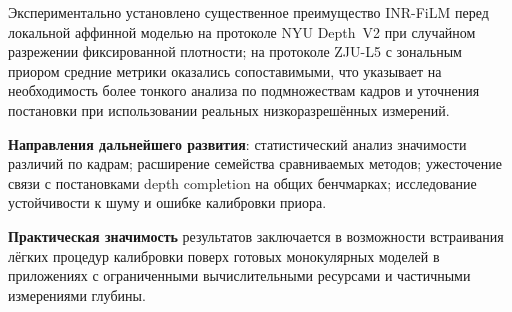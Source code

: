 \documentclass[12pt]{article}
\begin{document}
Экспериментально установлено существенное преимущество INR-FiLM перед локальной аффинной моделью на протоколе NYU Depth~V2 при случайном разрежении фиксированной плотности; на протоколе ZJU-L5 с зональным приором средние метрики оказались сопоставимыми, что указывает на необходимость более тонкого анализа по подмножествам кадров и уточнения постановки при использовании реальных низкоразрешённых измерений.

\textbf{Направления дальнейшего развития}: статистический анализ значимости различий по кадрам; расширение семейства сравниваемых методов; ужесточение связи с постановками depth completion на общих бенчмарках; исследование устойчивости к шуму и ошибке калибровки приора.

\textbf{Практическая значимость} результатов заключается в возможности встраивания лёгких процедур калибровки поверх готовых монокулярных моделей в приложениях с ограниченными вычислительными ресурсами и частичными измерениями глубины.


\end{document}
